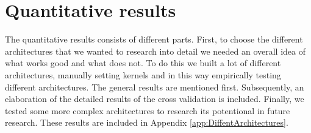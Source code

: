 \documentclass[a4paper,onecolumn]{report}
\begin{document}
\section{Quantitative results}
\label{sec:QuantitativeResults}
The quantitative results consists of different parts. First, to choose the different architectures that we wanted to research into detail we needed an overall idea of what works good and what does not. To do this we built a lot of different architectures, manually setting kernels and in this way empirically testing different architectures. The general results are mentioned first. Subsequently, an elaboration of the detailed results of the cross validation is included. Finally, we tested some more complex architectures to research its potentional in future research. These results are included in Appendix \ref{app:DiffentArchitectures}.
\end{document}
